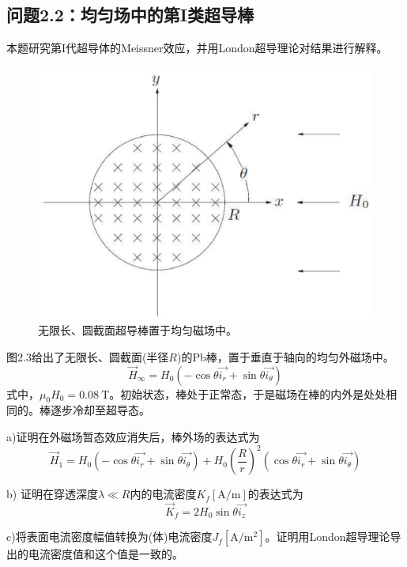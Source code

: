 \subsection{问题2.2：均匀场中的第I类超导棒}
本题研究第I代超导体的Meissner效应，并用London超导理论对结果进行解释。

\begin{figure}[htbp]
	\centering
	\includegraphics[scale=0.4]{chpt2/figs/fig2.3.eps}
	\caption{无限长、圆截面超导棒置于均匀磁场中。}
\end{figure}

图2.3给出了无限长、圆截面(半径$R$)的Pb棒，置于垂直于轴向的均匀外磁场中。
\begin{equation*}\label{eqn:2.40}
  \vec{H}_\infty = H_0 (-\cos \theta\vec{i_r}+\sin\theta\vec{i_\theta}) \tag{2.40}
\end{equation*}
式中，$\mu_0H_0=0.08\ \mathrm{T}$。初始状态，棒处于正常态，于是磁场在棒的内外是处处相同的。棒逐步冷却至超导态。

a)证明在外磁场暂态效应消失后，棒外场的表达式为
\begin{equation}
  \vec{H}_1=H_0(-\cos\theta\vec{i_r}+\sin\theta\vec{i_\theta})+H_0\left(\frac{R}{r}\right)^2 (\cos\theta\vec{i_r}+\sin\theta\vec{i_\theta})
\end{equation}

b) 证明在穿透深度$\lambda\ll R$内的电流密度$K_f [\mathrm{A/m}]$的表达式为
\begin{equation}
  \vec{K}_f=2H_0 \sin\theta\vec{i_z}
\end{equation}

c)将表面电流密度幅值转换为(体)电流密度$J_f [\mathrm{A/m^2}]$。证明用London超导理论导出的电流密度值和这个值是一致的。


